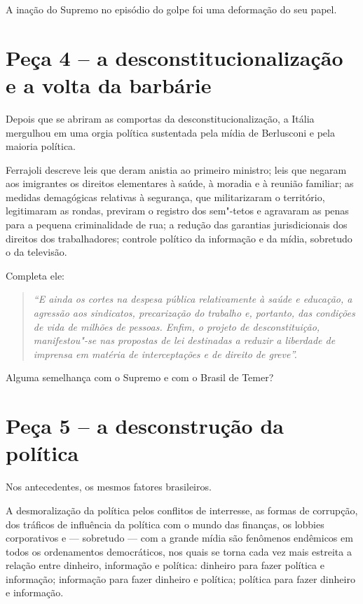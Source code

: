 A inação do Supremo no episódio do golpe foi uma deformação do seu
papel.

\section{Peça 4 -- a desconstitucionalização e a volta da barbárie}

Depois que se abriram as comportas da desconstitucionalização, a Itália
mergulhou em uma orgia política sustentada pela mídia de Berlusconi e
pela maioria política.

Ferrajoli descreve leis que deram anistia ao primeiro ministro; leis que
negaram aos imigrantes os direitos elementares à saúde, à moradia e à
reunião familiar; as medidas demagógicas relativas à segurança, que
militarizaram o território, legitimaram as rondas, previram o registro
dos sem"-tetos e agravaram as penas para a pequena criminalidade de rua;
a redução das garantias jurisdicionais dos direitos dos trabalhadores;
controle político da informação e da mídia, sobretudo o da televisão.

Completa ele:

\begin{quote}
\emph{``E ainda os cortes na despesa pública relativamente à saúde e
educação, a agressão aos sindicatos, precarização do trabalho e,
portanto, das condições de vida de milhões de pessoas. Enfim, o projeto
de desconstituição, manifestou"-se nas propostas de lei destinadas a
reduzir a liberdade de imprensa em matéria de interceptações e de
direito de greve''.}
\end{quote}

Alguma semelhança com o Supremo e com o Brasil de Temer?

\section{Peça 5 -- a desconstrução da política}

Nos antecedentes, os mesmos fatores brasileiros.

A desmoralização da política pelos conflitos de interresse, as formas de
corrupção, dos tráficos de influência da política com o mundo das
finanças, os lobbies corporativos e --- sobretudo --- com a grande mídia
são fenômenos endêmicos em todos os ordenamentos democráticos, nos quais
se torna cada vez mais estreita a relação entre dinheiro, informação e
política: dinheiro para fazer política e informação; informação para
fazer dinheiro e política; política para fazer dinheiro e informação.

